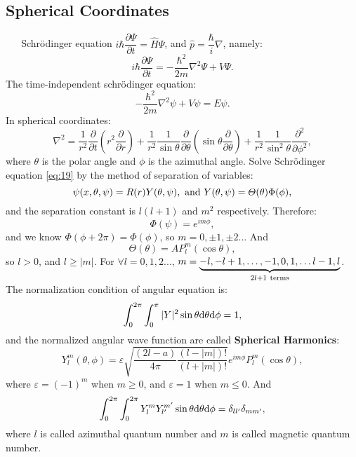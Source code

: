 \documentclass[12pt, 
]{article}
\begin{document}
\subsection{Spherical Coordinates}
$\phantom{aaa}$Schr\"odinger equation $i\hbar\dfrac{\partial \varPsi}{\partial t}=\hat{H}\varPsi$, and $\hat{p}=\dfrac{\hbar}{i}\nabla$, namely:
\begin{equation}\label{eq:18}
	i\hbar\frac{\partial\varPsi}{\partial t}=-\frac{\hbar^2}{2m}\nabla^2\varPsi+V\varPsi.
\end{equation}
The time-independent schr\"odinger equation:
\begin{equation}\label{eq:19}
	-\frac{\hbar^2}{2m}\nabla^2\psi+V\psi=E\psi.
\end{equation}
In spherical coordinates:
\[
	\nabla^2=\frac{1}{r^2}\frac{\partial}{\partial t}\left(r^2\frac{\partial}{\partial r}\right)+\frac{1}{r^2}\frac{1}{\sin\theta}\frac{\partial}{\partial\theta}\left(\sin\theta\frac{\partial}{\partial\theta}\right)+\frac{1}{r^2}\frac{1}{\sin^2\theta}\frac{\partial^2}{\partial \phi^2},
\]
where $\theta$ is the polar angle and $\phi$ is the azimuthal angle. Solve Schrödinger equation \eqref{eq:19} by the method of separation of variables:
\[
	\psi(x,\theta,\psi)=R(r)Y(\theta,\psi),~{\rm and~}Y(\theta,\psi)=\varTheta(\theta)\Phi(\phi),
\]
and the separation constant is $l(l+1)$ and $m^2$ respectively. Therefore:
\[
	\Phi(\psi)=e^{im\phi},
\]
and we know $\Phi(\phi+2\pi)=\Phi(\phi)$, so $m=0,\pm1,\pm2...$
And \[
	\varTheta(\theta)=AP_l^m(\cos\theta),
\]
so $l>0$, and $l\geqslant|m|$. For $\forall l=0,1,2...$, $m=\underbrace{-l,-l+1,\dots,-1,0,1,\dots l-1,l}_{2l+1~{\rm terms}}$.\\
The normalization condition of angular equation is:
\[
	\int_0^{2\pi}\int_0^{\pi}|Y|^2\sin\theta{\rm d}\theta{\rm d}\phi=1,
\]
and the normalized angular wave function are called {\bf Spherical Harmonics}:
\[
	Y_l^m(\theta,\phi)=\varepsilon\sqrt{\frac{(2l-a)}{4\pi}\frac{(l-|m|)!}{(l+|m|)!}}e^{im\phi}P_l^m(\cos\theta),
\]
where $\varepsilon=(-1)^m$ when $m\geqslant0$, and $\varepsilon=1$ when $m\leqslant0$. And
\[
	\int_0^{2\pi}\int_0^{2\pi}Y_l^mY_{l'}^{m'}\sin\theta{\rm d}\theta{\rm d}\phi=\delta_{ll'}\delta_{mm'},
\]
where $l$ is called azimuthal quantum number and $m$ is called magnetic quantum number.
\\
\end{document}

